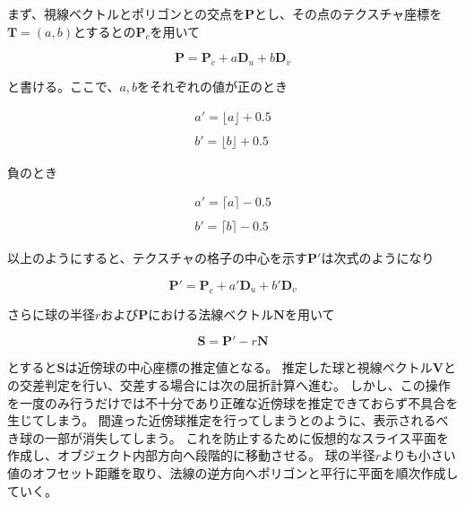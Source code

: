 まず、視線ベクトルとポリゴンとの交点を$\bm{P}$とし、その点のテクスチャ座標を$\bm{T} = (a, b)$とするとの$\bm{P}_c$を用いて

\begin{equation}
\label{EP}
\bm{P} = \bm{P}_c + a\bm{D}_u + b\bm{D}_v
\end{equation}

\noindent
と書ける。ここで、$a, b$をそれぞれの値が正のとき

\begin{eqnarray}
\label{Eadashplus}
a' = \lfloor a \rfloor + 0.5\\
\nonumber\\
\label{Ebdashplus}
b' = \lfloor b \rfloor + 0.5
\end{eqnarray}

\noindent
負のとき

\begin{eqnarray}
\label{Eadashminus}
a' = \lceil a \rceil - 0.5\\
\nonumber\\
\label{Ebdashminus}
b' = \lceil b \rceil - 0.5
\end{eqnarray}

\noindent
以上のようにすると、テクスチャの格子の中心を示す$\bm{P}'$は次式のようになり

\begin{equation}
\bm{P}' = \bm{P}_c + a'\bm{D}_u + b'\bm{D}_v 
\label{EPdash}
\end{equation}

\noindent
さらに球の半径$r$および$\bm{P}$における法線ベクトル$\bm{N}$を用いて

\begin{equation}
\bm{S} = \bm{P}' - r\bm{N} 
\label{ESpherepos}
\end{equation}

\noindent
とすると$\bm{S}$は近傍球の中心座標の推定値となる。
推定した球と視線ベクトル$\bm{V}$との交差判定を行い、交差する場合には次の屈折計算へ進む。
しかし、この操作を一度のみ行うだけでは不十分であり正確な近傍球を推定できておらず不具合を生じてしまう。
間違った近傍球推定を行ってしまうとのように、表示されるべき球の一部が消失してしまう。
これを防止するために仮想的なスライス平面を作成し、オブジェクト内部方向へ段階的に移動させる。
球の半径$r$よりも小さい値のオフセット距離を取り、法線の逆方向へポリゴンと平行に平面を順次作成していく。

